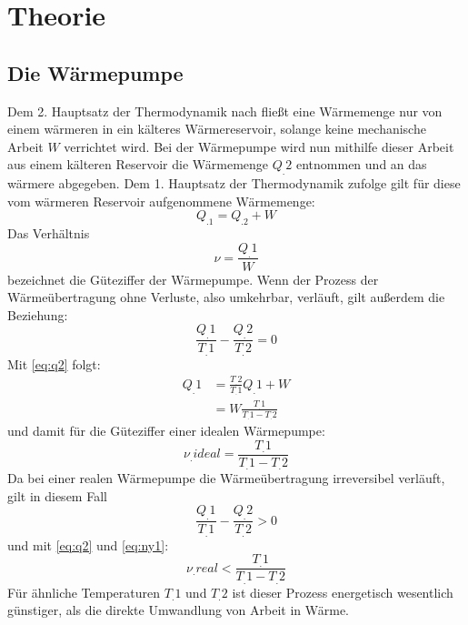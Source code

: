 
\section{Theorie}
\label{sec:Theorie}

\subsection{Die Wärmepumpe}
Dem 2. Hauptsatz der Thermodynamik nach fließt eine Wärmemenge nur von  einem  wärmeren in ein kälteres Wärmereservoir, solange keine mechanische Arbeit $W$ verrichtet wird.
Bei der Wärmepumpe wird nun mithilfe dieser Arbeit aus einem kälteren Reservoir die Wärmemenge $Q_.{2}$ entnommen und an das wärmere abgegeben. Dem 1. Hauptsatz der Thermodynamik zufolge gilt für diese vom wärmeren Reservoir aufgenommene Wärmemenge:
\begin{equation}
Q_.1 = Q_.2 + W \label{eq:q2}
\end{equation}
Das Verhältnis 
\begin{equation}
\nu = \frac{Q_.{1}}{W} \label{eq:ny1}
\end{equation}
bezeichnet die Güteziffer der Wärmepumpe.
Wenn der Prozess der Wärmeübertragung ohne Verluste, also umkehrbar, verläuft, gilt außerdem die Beziehung\cite{V206}:
\begin{equation}
\frac{Q_.{1}}{T_.{1}}-\frac{Q_.{2}}{T_.{2}} = 0 
\end{equation}
Mit \eqref{eq:q2} folgt:
\begin{align*}
Q_.{1} &= \frac{T_.{2}}{T_.{1}}Q_.{1} + W\\
	   &= W \frac{T_.{1}}{T_.{1}-T_.{2}} 
\end{align*}
und damit für die Güteziffer einer idealen Wärmepumpe\cite{V206}:
\begin{equation}
\nu_.{ideal} = \frac{T_.{1}}{T_.{1}-T_.{2}} \label{eq:nyideal}
\end{equation}
Da bei einer realen Wärmepumpe die Wärmeübertragung irreversibel verläuft, gilt in diesem Fall
\begin{equation}
\frac{Q_.{1}}{T_.{1}}-\frac{Q_.{2}}{T_.{2}} > 0 \label{eq:diffreal}
\end{equation}
und mit \eqref{eq:q2} und \eqref{eq:ny1}:
\begin{equation}
\nu_.{real} < \frac{T_.{1}}{T_.{1}-T_.{2}} \label{eq:nyreal} 
\end{equation}
Für ähnliche Temperaturen $T_.{1}$ und $T_.{2}$ ist dieser Prozess energetisch wesentlich günstiger, als die direkte Umwandlung von Arbeit in Wärme.\cite{V206}
